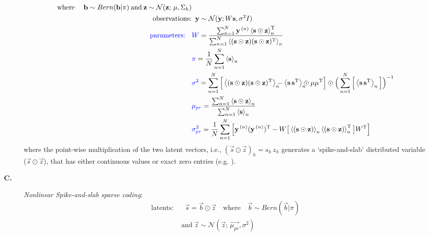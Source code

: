 \begin{description}
\begin{align}
\text{\quad}\mathrm{where\;}\quad \vec{b}\sim Bern(\vec{b} | \pi)
\:\mathrm{and} \:
\vec{z} \sim \mathcal{N}(\vec{z};\,\vec{\mu} , \Sigma_h)\nonumber\\
\text{\quad}\text{observations:} & \,\,\, \vec{y} \sim \mathcal{N}(\vec{y}; W\vec{s}, \sigma^2\One)\text{\quad}\text{\quad}\nonumber\\%
\text{\quad}\text{\quad}\text{\quad}\text{\quad}\text{\quad}\rev{\text{\;\;parameters: }} \,\,\,   %
  &\rev{W} = \frac{\sum_{n=1}^{N} \yVecN \E{\sVec\odot\zVec}^{\TT}_n}
  {\sum_{n=1}^{N} \E{(\sVec\odot\zVec)(\sVec\odot\zVec)^{\TT}}_n } \nonumber\\
%
&\rev{\piVec} =
\frac{1}{N}\sum_{n=1}^{N}\E{\sVec}_n \nonumber\\
%
&\rev{\sigma^2} =
    \sum_{n=1}^{N} \Big[\E{(\sVec\odot\zVec)(\sVec\odot\zVec)^{\TT}}_n 
    \ssb -  \E{\sVec\,\sVec^{\TT}}_n \ssb \odot \muVec\muVec^{\TT} \Big] 
    \odot \Big(\sum_{n=1}^{N}\Big[\E{\sVec\,\sVec^{\TT}}_n \Big]\Big)^{-1} \nonumber\\
%
&\rev{\mu_{pr}}  = \frac{\sum_{n=1}^{N} \E{\sVec\odot\zVec}_n}{\sum_{n=1}^{N}\E{\sVec}_n}  \nonumber\\
%
&\rev{\sigma^{2}_{pr}} = \frac{1}{N}\sum_{n=1}^{N}\Big[ \yVecN(\yVecN)^{\TT}
        - W\big[\E{(\sVec\odot\zVec)}_n\E{(\sVec\odot\zVec)}_n^{\TT}\big]W^{\TT}\Big]  \nonumber
\end{align}
where the point-wise multiplication of the two latent vectors, i.e., $(\vec{s}\odot\vec{z})_h = s_h\,z_h$
generates a `spike-and-slab' distributed variable ($\vec{s}\odot\vec{z}$), that has either continuous values or exact zero entries (e.g. \citep{TitsiasGredilla2011,GoodfellowEtAl2013,SheikhEtAl2014}).
%
\item[\textbf{C.}] \textit{Nonlinear Spike-and-slab sparse coding}:
\vspace{-.2cm}
%
\begin{align}\label{eq:ssmca}
\text{latents: } & \,\,\,\vec{s} = \vec{b}\odot\vec{z} \nonumber
\quad\mathrm{where}\quad \vec{b}\sim Bern(\vec{b} | \pi)\nonumber\\
\:&\mathrm{and} \:
\vec{z} \sim \mathcal{N}(\vec{z};\,\vec{\mu_{pr}} , \sigma^2) \nonumber\\ %

\end{align}
\end{description}
